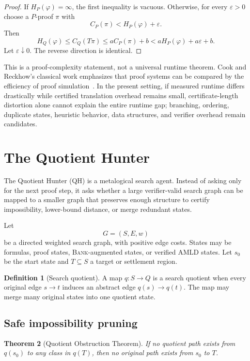 \documentclass[11pt]{article}
\newtheorem{theorem}{Theorem}[section]
\theoremstyle{definition}
\newtheorem{definition}[theorem]{Definition}
\theoremstyle{remark}
\newcommand{\BANK}{\textsc{Bank}}
\newcommand{\QH}{\textsc{QH}}
\begin{document}
\begin{proof}
If $H_P(\varphi)=\infty$, the first inequality is vacuous. Otherwise, for every $\varepsilon>0$ choose a $P$-proof $\pi$ with
\[
C_P(\pi)<H_P(\varphi)+\varepsilon.
\]
Then
\[
H_Q(\varphi)\le C_Q(T\pi)
\le aC_P(\pi)+b
<aH_P(\varphi)+a\varepsilon+b.
\]
Let $\varepsilon\downarrow0$. The reverse direction is identical.
\end{proof}

This is a proof-complexity statement, not a universal runtime theorem. Cook and Reckhow's classical work emphasizes that proof systems can be compared by the efficiency of proof simulation~\cite{CookReckhow1979}. In the present setting, if measured runtime differs drastically while certified translation overhead remains small, certificate-length distortion alone cannot explain the entire runtime gap; branching, ordering, duplicate states, heuristic behavior, data structures, and verifier overhead remain candidates.

\section{The Quotient Hunter}
The Quotient Hunter (\QH{}) is a metalogical search agent. Instead of asking only for the next proof step, it asks whether a large verifier-valid search graph can be mapped to a smaller graph that preserves enough structure to certify impossibility, lower-bound distance, or merge redundant states.

Let
\[
G=(S,E,w)
\]
be a directed weighted search graph, with positive edge costs. States may be formulas, proof states, \BANK{}-augmented states, or verified AMLD states. Let $s_0$ be the start state and $T\subseteq S$ a target or settlement region.

\begin{definition}[Search quotient]
A map $q:S\to Q$ is a search quotient when every original edge $s\to t$ induces an abstract edge $q(s)\to q(t)$. The map may merge many original states into one quotient state.
\end{definition}

\subsection{Safe impossibility pruning}
\begin{theorem}[Quotient Obstruction Theorem]\label{thm:obstruction}
If no quotient path exists from $q(s_0)$ to any class in $q(T)$, then no original path exists from $s_0$ to $T$.
\end{theorem}
\end{document}
